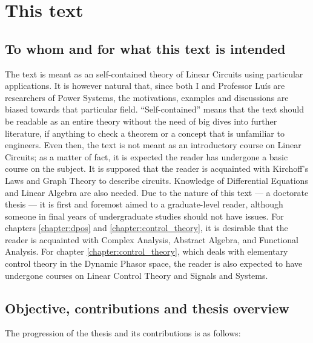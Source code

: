 \section{This text} %

\subsection{To whom and for what this text is intended}

	The text is meant as an self-contained theory of Linear Circuits using particular applications. It is however natural that, since both I and Professor Luís are researchers of Power Systems, the motivations, examples and discussions are biased towards that particular field. ``Self-contained'' means that the text should be readable as an entire theory without the need of big dives into further literature, if anything to check a theorem or a concept that is unfamiliar to engineers. Even then, the text is not meant as an introductory course on Linear Circuits; as a matter of fact, it is expected the reader has undergone a basic course on the subject. It is supposed that the reader is acquainted with Kirchoff's Laws and Graph Theory to describe circuits. Knowledge of Differential Equations and Linear Algebra are also needed. Due to the nature of this text — a doctorate thesis — it is first and foremost aimed to a graduate-level reader, although someone in final years of undergraduate studies should not have issues. For chapters \ref{chapter:dpos} and \ref{chapter:control_theory}, it is desirable that the reader is acquainted with Complex Analysis, Abstract Algebra, and Functional Analysis. For chapter \ref{chapter:control_theory}, which deals with elementary control theory in the Dynamic Phasor space, the reader is also expected to have undergone courses on Linear Control Theory and Signals and Systems.

\subsection{Objective, contributions and thesis overview}

	The progression of the thesis and its contributions is as follows:

